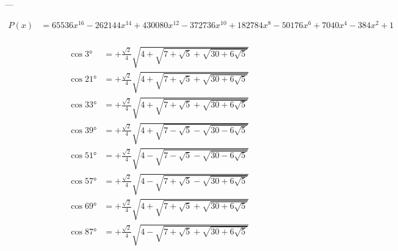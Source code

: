 ---

$$
\begin{aligned}
    P(x) &= 65536 x^{16}-262144 x^{14}+430080 x^{12}-372736 x^{10}+182784 x^8-50176 x^6+7040 x^4-384 x^2+1\\
\end{aligned}
$$

$$
\begin{aligned}
    \cos 3°  &= +\frac{\sqrt{2}}{4} \sqrt{4+\sqrt{7+\sqrt{5}+\sqrt{30+6\sqrt{5}}}}\\
    \cos 21° &= +\frac{\sqrt{2}}{4} \sqrt{4+\sqrt{7+\sqrt{5}+\sqrt{30+6\sqrt{5}}}}\\
    \cos 33° &= +\frac{\sqrt{2}}{4} \sqrt{4+\sqrt{7+\sqrt{5}+\sqrt{30+6\sqrt{5}}}}\\
    \cos 39° &= +\frac{\sqrt{2}}{4} \sqrt{4+\sqrt{7-\sqrt{5}-\sqrt{30-6\sqrt{5}}}}\\
    \cos 51° &= +\frac{\sqrt{2}}{4} \sqrt{4-\sqrt{7-\sqrt{5}-\sqrt{30-6\sqrt{5}}}}\\
    \cos 57° &= +\frac{\sqrt{2}}{4} \sqrt{4-\sqrt{7+\sqrt{5}-\sqrt{30+6\sqrt{5}}}}\\
    \cos 69° &= +\frac{\sqrt{2}}{4} \sqrt{4+\sqrt{7+\sqrt{5}+\sqrt{30+6\sqrt{5}}}}\\
    \cos 87° &= +\frac{\sqrt{2}}{4} \sqrt{4-\sqrt{7+\sqrt{5}+\sqrt{30+6\sqrt{5}}}}\\
\end{aligned}
$$
